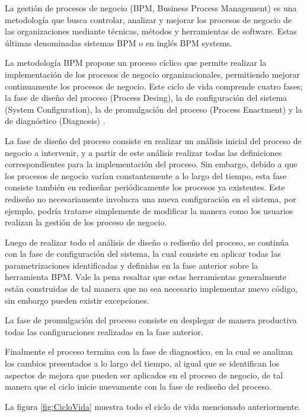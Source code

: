 La gestión de procesos de negocio (BPM, Business Process Management) es una metodología que busca controlar, analizar y mejorar los procesos de negocio de las organizaciones mediante técnicas, métodos y herramientas de software. Estas últimas denominadas sistemas BPM o en inglés BPM systems. 

La metodología BPM propone un proceso cíclico que permite realizar la implementación de los procesos de negocio organizacionales, permitiendo mejorar continuamente los procesos de negocio. Este ciclo de vida comprende cuatro fases; la fase de diseño del proceso (Process Desing), la de configuración del sistema (System Configuration), la de promulgación del proceso (Process Enactment) y la de diagnóstico (Diagnosis) \cite{VanderAalst2004}.

La fase de diseño del proceso consiste en realizar un análisis inicial del proceso de negocio a intervenir, y a partir de este análisis realizar todas las definiciones correspondientes para la implementación del proceso. Sin embargo, debido a que los procesos de negocio varían constantemente a lo largo del tiempo, esta fase consiste también en rediseñar periódicamente los procesos ya existentes. Este rediseño no necesariamente involucra una nueva configuración en el sistema, por ejemplo, podría tratarse simplemente de modificar la manera como los usuarios realizan la gestión de los proceso de negocio. 

Luego de realizar todo el análisis de diseño o rediseño del proceso, se continúa con la fase de configuración del sistema, la cual consiste en aplicar todas las parametrizaciones identificadas y definidas en la fase anterior sobre la herramienta BPM. Vale la pena resaltar que estas herramientas generalmente están construidas de tal manera que no sea necesario implementar nuevo código, sin embargo pueden existir excepciones.

La fase de promulgación del proceso consiste en desplegar de manera productiva todas las configuraciones realizadas en la fase anterior. 

Finalmente el proceso termina con la fase de diagnostico, en la cual se analizan los cambios presentados a lo largo del tiempo, al igual que se identifican los aspectos de mejora que pueden ser aplicados en el proceso de negocio, de tal manera que el ciclo inicie nuevamente con la fase de rediseño del proceso. 

La figura \ref{fig:CicloVida} muestra todo el ciclo de vida mencionado anteriormente.

